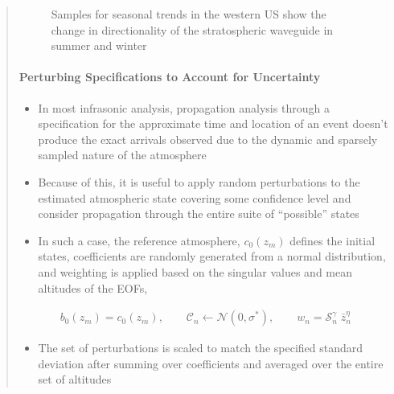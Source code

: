 \documentclass[letterpaper,10pt,english]{sphinxmanual}
\let\sphinxpxdimen\pdfpxdimen\else\newdimen\sphinxpxdimen
\begin{document}
\begin{itemize}
\begin{quote}
\begin{itemize}
\end{itemize}

\begin{figure}[htbp]
\centering
\capstart

\noindent\sphinxincludegraphics[width=500\sphinxpxdimen]{{US_RM-samples}.png}
\caption{Samples for seasonal trends in the western US show the change in directionality of the stratospheric waveguide in summer and winter}\label{\detokenize{sampling:id2}}\end{figure}


\paragraph{Perturbing Specifications to Account for Uncertainty}
\label{\detokenize{sampling:perturbing-specifications-to-account-for-uncertainty}}\begin{itemize}
\item {} 
In most infrasonic analysis, propagation analysis through a specification for the approximate time and location of an event doesn’t produce the exact arrivals observed due to the dynamic and sparsely sampled nature of the atmosphere

\item {} 
Because of this, it is useful to apply random perturbations to the estimated atmospheric state covering some confidence level and consider propagation through the entire suite of “possible” states

\item {} 
In such a case, the reference atmosphere, \(c_0 \left( z_m \right)\) defines the initial states, coefficients are randomly generated from a normal distribution, and weighting is applied based on the singular values and mean altitudes of the EOFs,

\end{itemize}
\begin{equation*}
\begin{split}b_0 \left( z_m \right) = c_0 \left( z_m \right), \quad \quad \mathcal{C}_n \longleftarrow \mathcal{N} \left(0, \sigma^* \right), \quad \quad w_n = \mathcal{S}_n^{\gamma} \; \bar{z}_n^{\eta}\end{split}
\end{equation*}\begin{itemize}
\item {} 
The set of perturbations is scaled to match the specified standard deviation after summing over coefficients and averaged over the entire set of altitudes


\end{itemize}
\end{quote}
\end{itemize}
\end{document}
